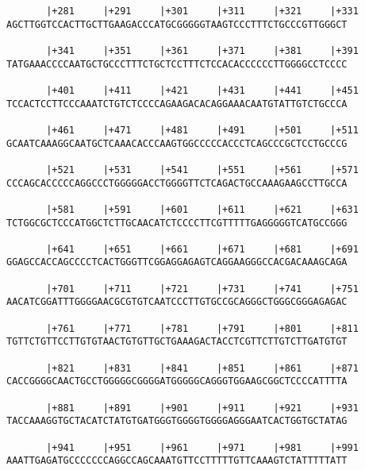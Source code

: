 \documentclass{article}
\begin{document}
\begin{Verbatim}
       |+281     |+291     |+301     |+311     |+321     |+331
AGCTTGGTCCACTTGCTTGAAGACCCATGCGGGGGTAAGTCCCTTTCTGCCCGTTGGGCT
                                                            
       |+341     |+351     |+361     |+371     |+381     |+391
TATGAAACCCCAATGCTGCCCTTTCTGCTCCTTTCTCCACACCCCCCTTGGGGCCTCCCC
                                                            
       |+401     |+411     |+421     |+431     |+441     |+451
TCCACTCCTTCCCAAATCTGTCTCCCCAGAAGACACAGGAAACAATGTATTGTCTGCCCA
                                                            
       |+461     |+471     |+481     |+491     |+501     |+511
GCAATCAAAGGCAATGCTCAAACACCCAAGTGGCCCCCACCCTCAGCCCGCTCCTGCCCG
                                                            
       |+521     |+531     |+541     |+551     |+561     |+571
CCCAGCACCCCCAGGCCCTGGGGGACCTGGGGTTCTCAGACTGCCAAAGAAGCCTTGCCA
                                                            
       |+581     |+591     |+601     |+611     |+621     |+631
TCTGGCGCTCCCATGGCTCTTGCAACATCTCCCCTTCGTTTTTGAGGGGGTCATGCCGGG
                                                            
       |+641     |+651     |+661     |+671     |+681     |+691
GGAGCCACCAGCCCCTCACTGGGTTCGGAGGAGAGTCAGGAAGGGCCACGACAAAGCAGA
                                                            
       |+701     |+711     |+721     |+731     |+741     |+751
AACATCGGATTTGGGGAACGCGTGTCAATCCCTTGTGCCGCAGGGCTGGGCGGGAGAGAC
                                                            
       |+761     |+771     |+781     |+791     |+801     |+811
TGTTCTGTTCCTTGTGTAACTGTGTTGCTGAAAGACTACCTCGTTCTTGTCTTGATGTGT
                                                            
       |+821     |+831     |+841     |+851     |+861     |+871
CACCGGGGCAACTGCCTGGGGGCGGGGATGGGGGCAGGGTGGAAGCGGCTCCCCATTTTA
                                                            
       |+881     |+891     |+901     |+911     |+921     |+931
TACCAAAGGTGCTACATCTATGTGATGGGTGGGGTGGGGAGGGAATCACTGGTGCTATAG
                                                            
       |+941     |+951     |+961     |+971     |+981     |+991
AAATTGAGATGCCCCCCCAGGCCAGCAAATGTTCCTTTTTGTTCAAAGTCTATTTTTATT
                                                            

\end{Verbatim}
\end{document}
